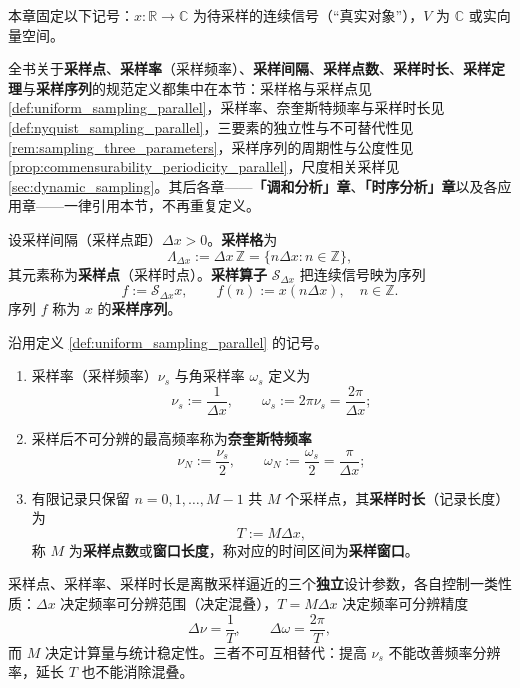 本章固定以下记号：$x:\mathbb{R}\to\mathbb{C}$ 为待采样的连续信号（“真实对象”），$V$ 为 $\mathbb{C}$ 或实向量空间。

\begin{remark}[采样概念的规范定义处]\label{rem:sampling_terminology_home}
全书关于\textbf{采样点}、\textbf{采样率}（采样频率）、\textbf{采样间隔}、\textbf{采样点数}、\textbf{采样时长}、\textbf{采样定理}与\textbf{采样序列}的规范定义都集中在本节：采样格与采样点见 \cref{def:uniform_sampling_parallel}，采样率、奈奎斯特频率与采样时长见 \cref{def:nyquist_sampling_parallel}，三要素的独立性与不可替代性见 \cref{rem:sampling_three_parameters}，采样序列的周期性与公度性见 \cref{prop:commensurability_periodicity_parallel}，尺度相关采样见 \cref{sec:dynamic_sampling}。其后各章——\textbf{「调和分析」章}、\textbf{「时序分析」章}以及各应用章——一律引用本节，不再重复定义。
\end{remark}

\begin{definition}[采样格与采样点]\label{def:uniform_sampling_parallel}
设采样间隔（采样点距）$\Delta x>0$。\textbf{采样格}为
\[
\Lambda_{\Delta x}:=\Delta x\,\mathbb{Z}=\{n\Delta x : n\in\mathbb{Z}\},
\]
其元素称为\textbf{采样点}（采样时点）。\textbf{采样算子} $\mathcal{S}_{\Delta x}$ 把连续信号映为序列
\[
f:=\mathcal{S}_{\Delta x}x,\qquad f(n):=x(n\Delta x),\quad n\in\mathbb{Z}.
\]
序列 $f$ 称为 $x$ 的\textbf{采样序列}。
\end{definition}

\begin{definition}\label{def:nyquist_sampling_parallel}
沿用定义 \ref{def:uniform_sampling_parallel} 的记号。
\begin{enumerate}[label=(\roman*)]
    \item 采样率（采样频率）$\nu_s$ 与角采样率 $\omega_s$ 定义为
    \[
    \nu_s:=\frac{1}{\Delta x},\qquad \omega_s:=2\pi\nu_s=\frac{2\pi}{\Delta x};
    \]
    \item 采样后不可分辨的最高频率称为\textbf{奈奎斯特频率}
    \[
    \nu_N:=\frac{\nu_s}{2},\qquad \omega_N:=\frac{\omega_s}{2}=\frac{\pi}{\Delta x};
    \]
    \item 有限记录只保留 $n=0,1,\dots,M-1$ 共 $M$ 个采样点，其\textbf{采样时长}（记录长度）为
    \[
    T:=M\Delta x,
    \]
    称 $M$ 为\textbf{采样点数}或\textbf{窗口长度}，称对应的时间区间为\textbf{采样窗口}。
\end{enumerate}
\end{definition}

\begin{remark}[三要素的不可替代性]\label{rem:sampling_three_parameters}
采样点、采样率、采样时长是离散采样逼近的三个\textbf{独立}设计参数，各自控制一类性质：$\Delta x$ 决定频率可分辨范围（决定混叠），$T=M\Delta x$ 决定频率可分辨精度
\[
\Delta\nu=\frac{1}{T},\qquad \Delta\omega=\frac{2\pi}{T},
\]
而 $M$ 决定计算量与统计稳定性。三者不可互相替代：提高 $\nu_s$ 不能改善频率分辨率，延长 $T$ 也不能消除混叠。
\end{remark}

